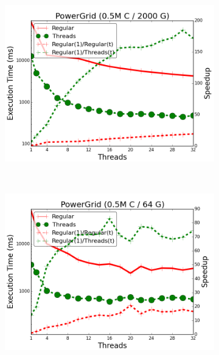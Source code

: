 \begin{figure}[]
        \centering
        \begin{subfigure}[b]{\plotsize\textwidth}
           \includegraphics[width=\textwidth]{experiments/threads/cmp-powergrid-500000C2000G.png}
           \mycap{}
           \label{fig:threads:powergrid1}
        \end{subfigure}
        ~
        \begin{subfigure}[b]{\plotsize\textwidth}
           \includegraphics[width=\textwidth]{experiments/threads/cmp-powergrid-500000C64G.png}
           \mycap{}
           \label{fig:threads:powergrid2}
        \end{subfigure} \\

\end{figure}
